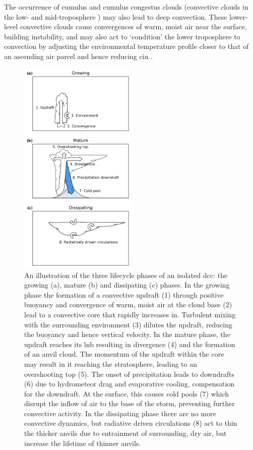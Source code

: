 The occurrence of cumulus and cumulus congestus clouds (convective clouds in the low- and mid-troposphere \citep{johnson_trimodal_1999}) may also lead to deep convection. 
These lower-level convective clouds cause convergences of warm, moist air near the surface, building instability, and may also act to `condition’ the lower troposphere to convection by adjusting the environmental temperature profile closer to that of an ascending air parcel and hence reducing \acrshort{cin} \citep{masunaga_mechanism_2014, schulz_observing_2018}.

\begin{figure}[tp]
    \centering
    \includegraphics[width=0.5\textwidth]{figures/Intro_DCC_lifecycle.png}
    \caption[
    An illustration of the three lifecycle phases of an isolated \acrshort{dcc}
    ]{
    An illustration of the three lifecycle phases of an isolated \acrshort{dcc}: the growing (a), mature (b) and dissipating (c) phases. In the growing phase the formation of a convective updraft (1) through positive buoyancy and convergence of warm, moist air at the cloud base (2) lead to a convective core that rapidly increases in. Turbulent mixing with the surrounding environment (3) dilutes the updraft, reducing the buoyancy and hence vertical velocity. In the mature phase, the updraft reaches its \acrshort{lnb} resulting in divergence (4) and the formation of an anvil cloud. The momentum of the updraft within the core may result in it reaching the stratosphere, leading to an overshooting top (5). The onset of precipitation leads to downdrafts (6) due to hydrometeor drag and evaporative cooling, compensation for the downdraft. At the surface, this causes cold pools (7) which disrupt the inflow of air to the base of the storm, preventing further convective activity. In the dissipating phase there are no more convective dynamics, but radiative driven circulations (8) act to thin the thicker anvils due to entrainment of surrounding, dry air, but increase the lifetime of thinner anvils.
    }
    \label{fig:dcc_lifecycle_illustration}
\end{figure}

